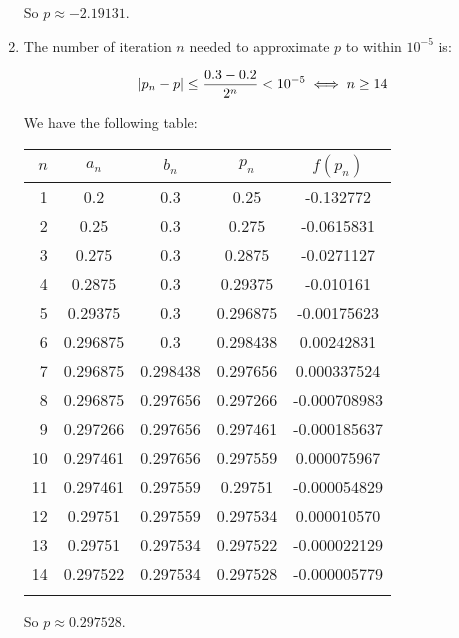 \documentclass[../../Assignments.tex]{subfiles}
\begin{document}
\begin{solution}
\begin{enumerate}[label=(\alph*)]
            So \(p \approx \num{-2.19131}\).

        \item The number of iteration \(n\) needed to approximate \(p\) to
            within \(10^{-5}\) is:

            \[\abs{p_n - p} \leq \frac{\num{0.3} - \num{0.2}}{2^n} < 10^{-5} \iff n \geq 14\]

            We have the following table:

            \begin{tabular}{r S[table-format=1.6] S[table-format=1.6] S[table-format=1.6] S[table-format=-1.9]}
                \\
                \toprule
                \(n\)  &  {\(a_n\)}  &  {\(b_n\)}  &  {\(p_n\)}  &  {\(f(p_n)\)}  \\
                  &  0.2        &  0.3        &  0.25       &  -0.132772     \\
                    2  &  0.25       &  0.3        &  0.275      &  -0.0615831    \\
                    3  &  0.275      &  0.3        &  0.2875     &  -0.0271127    \\
                    4  &  0.2875     &  0.3        &  0.29375    &  -0.010161     \\
                    5  &  0.29375    &  0.3        &  0.296875   &  -0.00175623   \\
                    6  &  0.296875   &  0.3        &  0.298438   &   0.00242831   \\
                    7  &  0.296875   &  0.298438   &  0.297656   &   0.000337524  \\
                    8  &  0.296875   &  0.297656   &  0.297266   &  -0.000708983  \\
                    9  &  0.297266   &  0.297656   &  0.297461   &  -0.000185637  \\
                   10  &  0.297461   &  0.297656   &  0.297559   &   0.000075967  \\
                   11  &  0.297461   &  0.297559   &  0.29751    &  -0.000054829  \\
                   12  &  0.29751    &  0.297559   &  0.297534   &   0.000010570  \\
                   13  &  0.29751    &  0.297534   &  0.297522   &  -0.000022129  \\
                   14  &  0.297522   &  0.297534   &  0.297528   &  -0.000005779  \\
                \bottomrule
                \\
            \end{tabular}

            So \(p \approx \num{0.297528}\).
    \end{enumerate}
\end{solution}
\end{document}
